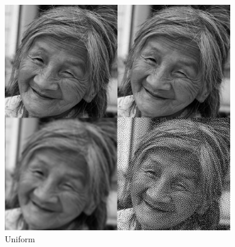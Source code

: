 \begin{figure}[H]
\begin{center}
\includegraphics[width=100mm]{u03/uni.eps}
\end{center}
\caption{Uniform}
\end{figure}


